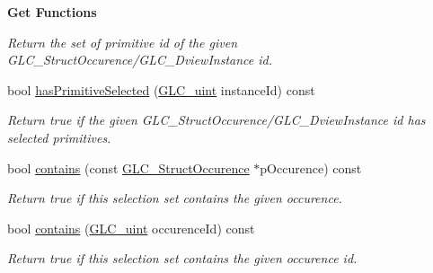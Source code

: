 \begin{Indent}{\bf Get Functions}
\begin{DoxyCompactItemize}
\begin{DoxyCompactList}\small\item\em Return the set of primitive id of the given G\-L\-C\-\_\-\-Struct\-Occurence/\-G\-L\-C\-\_\-Dview\-Instance id. \end{DoxyCompactList}\item 
bool \hyperlink{class_g_l_c___selection_set_abfd86ff033b3c26a7037ae12b021acce}{has\-Primitive\-Selected} (\hyperlink{glc__global_8h_abf950976fabed69026558df8e2da6c6b}{G\-L\-C\-\_\-uint} instance\-Id) const 
\begin{DoxyCompactList}\small\item\em Return true if the given G\-L\-C\-\_\-\-Struct\-Occurence/\-G\-L\-C\-\_\-Dview\-Instance id has selected primitives. \end{DoxyCompactList}\item 
bool \hyperlink{class_g_l_c___selection_set_a52538198f5fa0e726733f376af737a4f}{contains} (const \hyperlink{class_g_l_c___struct_occurence}{G\-L\-C\-\_\-\-Struct\-Occurence} $\ast$p\-Occurence) const 
\begin{DoxyCompactList}\small\item\em Return true if this selection set contains the given occurence. \end{DoxyCompactList}\item 
bool \hyperlink{class_g_l_c___selection_set_aeb6c2fa80596fb03c3a29811562c9521}{contains} (\hyperlink{glc__global_8h_abf950976fabed69026558df8e2da6c6b}{G\-L\-C\-\_\-uint} occurence\-Id) const 
\begin{DoxyCompactList}\small\item\em Return true if this selection set contains the given occurence id. \end{DoxyCompactList}\end{DoxyCompactItemize}
\end{Indent}
